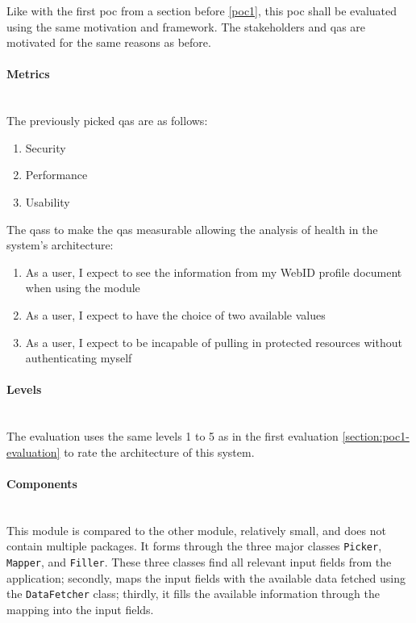 Like with the first \gls{poc} from a section before \ref{poc1}, this \gls{poc} shall be evaluated using the same motivation and framework. The stakeholders and \glspl{qa} are motivated for the same reasons as before.
\vspace{0.5cm}
\paragraph{Metrics}\mbox{}\\

The previously picked \glspl{qa} are as follows:

\begin{enumerate}
    \item Security
    \item Performance
    \item Usability
\end{enumerate}

The \glspl{qas} to make the \glspl{qa} measurable allowing the analysis of health in the system's architecture:

\begin{enumerate}
    \item As a user, I expect to see the information from my WebID profile document when using the module
    \item As a user, I expect to have the choice of two available values
    \item As a user, I expect to be incapable of pulling in protected resources without authenticating myself
\end{enumerate}
\vspace{0.5cm}
\paragraph{Levels}\mbox{}\\

The evaluation uses the same levels 1 to 5 as in the first evaluation \ref{section:poc1-evaluation} to rate the architecture of this system.
\vspace{0.5cm}
\paragraph{Components}\mbox{}\\

This module is compared to the other module, relatively small, and does not contain multiple packages. It forms through the three major classes \texttt{Picker}, \texttt{Mapper}, and \texttt{Filler}. These three classes find all relevant input fields from the application; secondly, maps the input fields with the available data fetched using the \texttt{DataFetcher} class; thirdly, it fills the available information through the mapping into the input fields.

